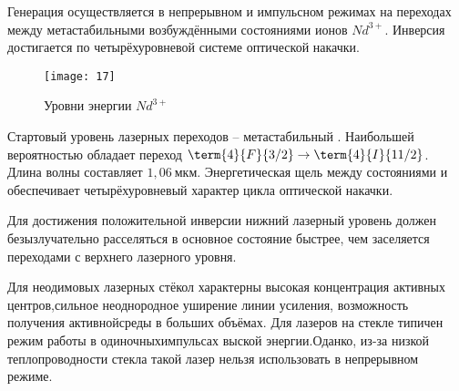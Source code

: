 Генерация осуществляется в непрерывном и импульсном режимах на переходах между 
метастабильными возбуждёнными состояниями ионов \( Nd^{3+} \). Инверсия 
достигается по четырёхуровневой системе оптической накачки.

\begin{figure}[h]
    \center
    \texttt{[image: 17]}
    \caption{Уровни энергии \( Nd^{3+} \)}
\end{figure}

Стартовый уровень лазерных переходов -- метастабильный .
Наибольшей вероятностью обладает переход \( \term{4}{F}{3/2} \rightarrow
\term{4}{I}{11/2} \). Длина волны составляет \( 1,06~\text{мкм} \).
Энергетическая щель между состояниями  и 
обеспечивает четырёхуровневый характер цикла оптической накачки.

Для достижения положительной инверсии нижний лазерный уровень должен
безызлучательно расселяться в основное состояние быстрее, чем заселяется
переходами с верхнего лазерного уровня.

Для неодимовых лазерных стёкол характерны высокая концентрация активных 
центров,сильное неоднородное уширение линии усиления, возможность получения 
активнойсреды в больших объёмах. Для лазеров на стекле типичен режим работы 
в одиночныхимпульсах выской энергии.Оданко, из-за низкой теплопроводности 
стекла такой лазер нельзя использовать в непрерывном режиме.